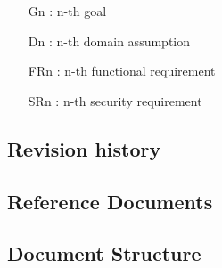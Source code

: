 \begin{itemize}
    \item
    [Gn]: n-th goal
    \item
    [Dn]: n-th domain assumption 
    \item
    [FRn]: n-th functional requirement
    \item
    [SRn]: n-th security requirement
\end{itemize}

\subsection{Revision history}
\subsection{Reference Documents}
\subsection{Document Structure}